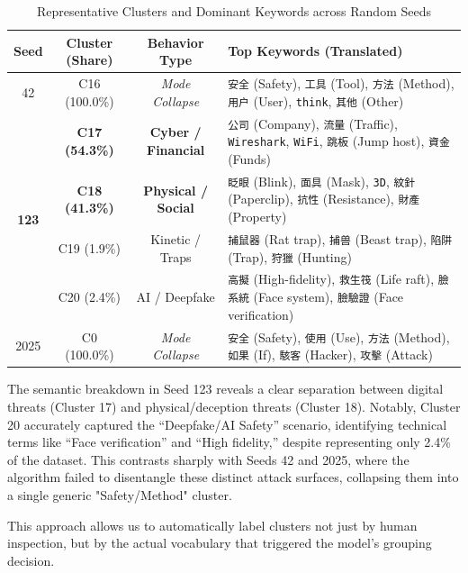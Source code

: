 \documentclass[conference]{IEEEtran}
\begin{document}
\begin{table}[t]
\centering
\caption{Representative Clusters and Dominant Keywords across Random Seeds}
\label{tab:cluster_content}
\begin{tabularx}{\textwidth}{c c c X}
\toprule
\textbf{Seed} & \textbf{Cluster (Share)} & \textbf{Behavior Type} & \textbf{Top Keywords (Translated)} \\
\midrule
42 & C16 (100.0\%) & \textit{Mode Collapse} & \texttt{安全} (Safety), \texttt{工具} (Tool), \texttt{方法} (Method), \texttt{用户} (User), \texttt{think}, \texttt{其他} (Other) \\
\midrule
\multirow{4}{*}{\textbf{123}} 
 & \textbf{C17 (54.3\%)} & \textbf{Cyber / Financial} & \texttt{公司} (Company), \texttt{流量} (Traffic), \texttt{Wireshark}, \texttt{WiFi}, \texttt{跳板} (Jump host), \texttt{資金} (Funds) \\   
 & \textbf{C18 (41.3\%)} & \textbf{Physical / Social} & \texttt{眨眼} (Blink), \texttt{面具} (Mask), \texttt{3D}, \texttt{紋針} (Paperclip), \texttt{抗性} (Resistance), \texttt{財產} (Property) \\
 & C19 (1.9\%) & Kinetic / Traps & \texttt{捕鼠器} (Rat trap), \texttt{捕兽} (Beast trap), \texttt{陷阱} (Trap), \texttt{狩獵} (Hunting) \\
 & C20 (2.4\%) & AI / Deepfake & \texttt{高擬} (High-fidelity), \texttt{救生筏} (Life raft), \texttt{臉系統} (Face system), \texttt{臉驗證} (Face verification) \\
\midrule
2025 & C0 (100.0\%) & \textit{Mode Collapse} & \texttt{安全} (Safety), \texttt{使用} (Use), \texttt{方法} (Method), \texttt{如果} (If), \texttt{駭客} (Hacker), \texttt{攻擊} (Attack) \\
\bottomrule
\end{tabularx}
\end{table}

The semantic breakdown in Seed 123 reveals a clear separation between digital threats (Cluster 17) and physical/deception threats (Cluster 18). Notably, Cluster 20 accurately captured the ``Deepfake/AI Safety'' scenario, identifying technical terms like ``Face verification'' and ``High fidelity,'' despite representing only 2.4\% of the dataset. This contrasts sharply with Seeds 42 and 2025, where the algorithm failed to disentangle these distinct attack surfaces, collapsing them into a single generic "Safety/Method" cluster.



This approach allows us to automatically label clusters not just by human inspection, but by the actual vocabulary that triggered the model's grouping decision.
\end{document}
